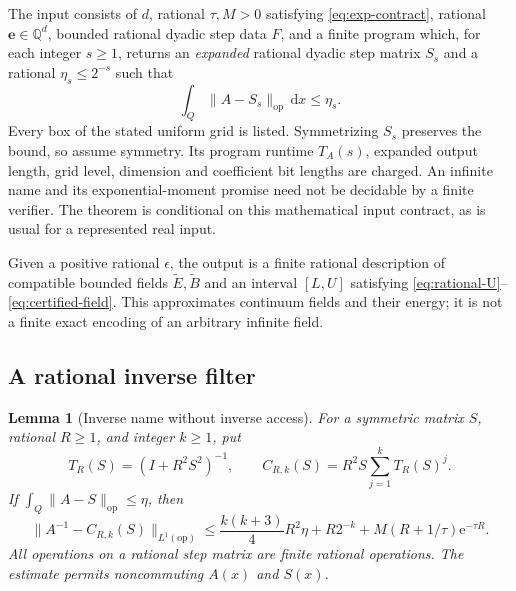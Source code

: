 \documentclass[11pt,a4paper]{article}
\numberwithin{equation}{section}
\newtheorem{lemma}[theorem]{Lemma}
\theoremstyle{definition}
\theoremstyle{remark}\newtheorem{remark}[theorem]{Remark}
\newcommand{\Q}{\mathbb Q}
\newcommand{\ee}{\mathrm e}
\newcommand{\Id}{I}
\newcommand{\dd}{\,\mathrm dx}
\newcommand{\norm}[1]{\lVert #1\rVert}
\newcommand{\op}{\mathrm{op}}
\newcommand{\evec}{\boldsymbol e}
\begin{document}
The input consists of \(d\), rational \(\tau,M>0\) satisfying
\eqref{eq:exp-contract}, rational \(\evec\in\Q^d\), bounded rational
dyadic step data \(F\), and a finite program which, for each integer
\(s\geq1\), returns an \emph{expanded} rational dyadic step matrix
\(S_s\) and a rational \(\eta_s\leq2^{-s}\) such that
\begin{equation}\label{eq:coefficient-name}
 \int_Q\norm{A-S_s}_{\op}\dd\leq\eta_s.
\end{equation}
Every box of the stated uniform grid is listed.
Symmetrizing \(S_s\) preserves the bound, so assume symmetry.
Its program runtime \(T_A(s)\), expanded output length, grid level,
dimension and coefficient bit lengths are charged.
An infinite name and its exponential-moment promise need not be decidable
by a finite verifier. The theorem is conditional on this mathematical
input contract, as is usual for a represented real input.

Given a positive rational \(\epsilon\), the output is a finite rational
description of compatible bounded fields \(\widetilde E,\widetilde B\)
and an interval \([L,U]\) satisfying \eqref{eq:rational-U}--\eqref{eq:certified-field}.
This approximates continuum fields and their energy; it is not a finite
exact encoding of an arbitrary infinite field.

\subsection{A rational inverse filter}

\begin{lemma}[Inverse name without inverse access]\label{lem:inverse-filter}
For a symmetric matrix \(S\), rational \(R\geq1\), and integer \(k\geq1\),
put
\[
 T_R(S)=(\Id+R^2S^2)^{-1},\qquad
 C_{R,k}(S)=R^2S\sum_{j=1}^kT_R(S)^j.
\]
If \(\int_Q\norm{A-S}_{\op}\leq\eta\), then
\begin{equation}\label{eq:inverse-filter-bound}
 \norm{A^{-1}-C_{R,k}(S)}_{L^1(\op)}
 \leq \frac{k(k+3)}4R^2\eta+R2^{-k}
                  +M(R+1/\tau)\ee^{-\tau R}.
\end{equation}
All operations on a rational step matrix are finite rational operations.
The estimate permits noncommuting \(A(x)\) and \(S(x)\).
\end{lemma}
\end{document}
